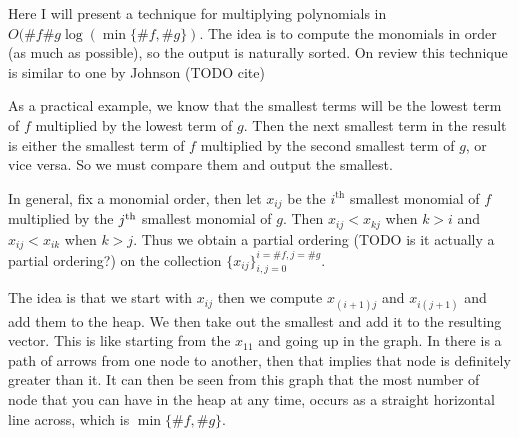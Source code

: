 Here I will present a technique for multiplying polynomials in $O(\# f \# g \log (\min\{\# f, \# g\})$. The idea is to compute the monomials in order (as much as possible), so the output is naturally sorted. On review this technique is similar to one by Johnson (TODO cite)

As a practical example, we know that the smallest terms will be the lowest term of $f$ multiplied by the lowest term of $g$. Then the next smallest term in the result is either the smallest term of $f$ multiplied by the second smallest term of $g$, or vice versa. So we must compare them and output the smallest. 

In general, fix a monomial order, then let $x_{ij}$ be the $i^{\text{th}}$ smallest monomial of $f$ multiplied by the $j^{\textrm{th}}$ smallest monomial of $g$. Then $x_{ij} < x_{kj}$ when $k > i$ and $x_{ij} < x_{ik}$ when $k > j$. Thus we obtain a partial ordering (TODO is it actually a partial ordering?) on the collection $\{x_{ij}\}_{i, j=0}^{i=\# f, j = \#g}$. 

\begin{figure}
    \center
\end{figure}

The idea is that we start with $x_{ij}$ then we compute $x_{(i+1)j}$ and $x_{i(j+1)}$ and add them to the heap. We then take out the smallest and add it to the resulting vector. This is like starting from the $x_{11}$ and going up in the graph. In there is a path of arrows from one node to another, then that implies that node is definitely greater than it. It can then be seen from this graph that the most number of node that you can have in the heap at any time, occurs as a straight horizontal line across, which is $\min\{\# f, \# g\}$.


